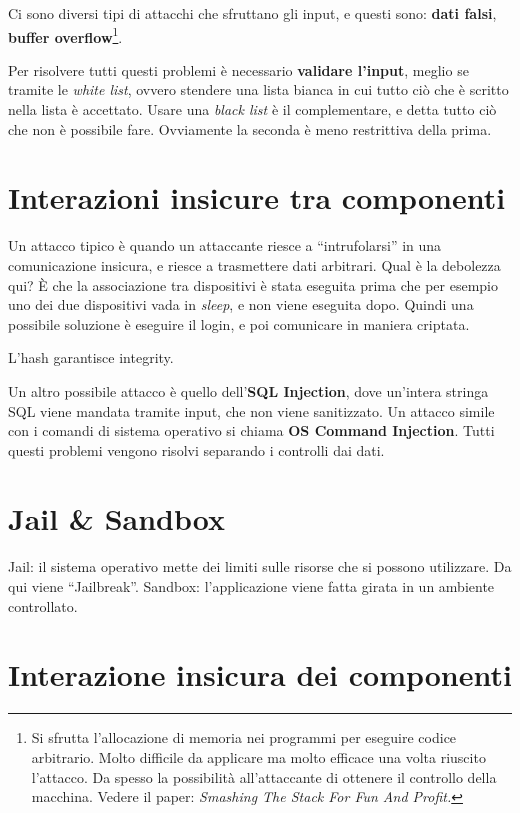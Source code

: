 Ci sono diversi tipi di attacchi che sfruttano gli input, e questi sono: 
\textbf{dati falsi}, \textbf{buffer overflow}\footnote{Si sfrutta l'allocazione 
di memoria nei programmi per eseguire codice arbitrario. Molto difficile da 
applicare ma molto efficace una volta riuscito l'attacco. Da spesso la 
possibilità all'attaccante di ottenere il controllo della macchina. Vedere il 
paper: \textit{Smashing The Stack For Fun And Profit.}}.

Per risolvere tutti questi problemi è necessario \textbf{validare l'input}, 
meglio se tramite le \textit{white list}, ovvero stendere una lista bianca in 
cui tutto ciò che è scritto nella lista è accettato. Usare una \textit{black 
list} è il complementare, e detta tutto ciò che non è possibile fare. Ovviamente 
la seconda è meno restrittiva della prima.

\section{Interazioni insicure tra componenti}

Un attacco tipico è quando un attaccante riesce a ``intrufolarsi'' in una 
comunicazione insicura, e riesce a trasmettere dati arbitrari.
Qual è la debolezza qui? È che la associazione tra dispositivi è stata eseguita 
prima che per esempio uno dei due dispositivi vada in \textit{sleep}, e non 
viene eseguita dopo. Quindi una possibile soluzione è eseguire il login, e poi 
comunicare in maniera criptata.

L'hash garantisce integrity.

Un altro possibile attacco è quello dell'\textbf{SQL Injection}, dove un'intera 
stringa SQL viene mandata tramite input, che non viene sanitizzato. Un attacco 
simile con i comandi di sistema operativo si chiama \textbf{OS Command 
Injection}. Tutti questi problemi vengono risolvi separando i controlli dai 
dati.

\section{Jail \& Sandbox}

Jail: il sistema operativo mette dei limiti sulle risorse che si possono 
utilizzare.
Da qui viene ``Jailbreak''.
Sandbox: l'applicazione viene fatta girata in un ambiente controllato.

\section{Interazione insicura dei componenti}

